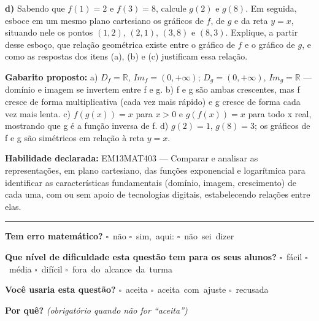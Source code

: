 \documentclass[11pt,a4paper]{article}
\begin{document}
\begin{samepage}
\textbf{d)} Sabendo que $f(1) = 2$ e $f(3) = 8$, calcule $g(2)$ e $g(8)$. Em seguida, esboce em um mesmo plano cartesiano os gráficos de $f$, de $g$ e da reta $y = x$, situando nele os pontos $(1,2)$, $(2,1)$, $(3,8)$ e $(8,3)$. Explique, a partir desse esboço, que relação geométrica existe entre o gráfico de $f$ e o gráfico de $g$, e como as respostas dos itens (a), (b) e (c) justificam essa relação.

\textbf{Gabarito proposto:} a) $D_f=\mathbb{R}$, $Im_f=(0,+\infty)$; $D_g=(0,+\infty)$, $Im_g=\mathbb{R}$ — domínio e imagem se invertem entre f e g. b) f e g são ambas crescentes, mas f cresce de forma multiplicativa (cada vez mais rápido) e g cresce de forma cada vez mais lenta. c) $f(g(x))=x$ para $x>0$ e $g(f(x))=x$ para todo x real, mostrando que g é a função inversa de f. d) $g(2)=1$, $g(8)=3$; os gráficos de f e g são simétricos em relação à reta $y=x$.

\textbf{Habilidade declarada:} EM13MAT403 --- Comparar e analisar as representações, em plano cartesiano, das funções exponencial e logarítmica para identificar as características fundamentais (domínio, imagem, crescimento) de cada uma, com ou sem apoio de tecnologias digitais, estabelecendo relações entre elas.
\end{samepage}

\noindent\rule{\linewidth}{0.4pt}
\textbf{Tem erro matemático?}\quad
\mbox{$\square$~não} \quad \mbox{$\square$~sim, aqui:} \underline{\hspace{5cm}}
\quad \mbox{$\square$~não sei dizer}

\textbf{Que nível de dificuldade esta questão tem para os seus alunos?}\quad
\mbox{$\square$~fácil} \quad \mbox{$\square$~média} \quad
\mbox{$\square$~difícil} \quad \mbox{$\square$~fora do alcance da turma}

\textbf{Você usaria esta questão?}\quad
\mbox{$\square$~aceita} \quad \mbox{$\square$~aceita com ajuste} \quad
\mbox{$\square$~recusada}

\textbf{Por quê?} \emph{(obrigatório quando não for ``aceita'')}

\underline{\hspace{\linewidth}}

\underline{\hspace{\linewidth}}
\vspace{0.6em}
\end{document}
